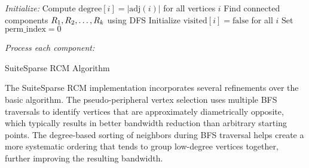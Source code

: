 \begin{algorithm}
    
    \BlankLine
    
    \emph{Initialize:}\;
    Compute $\text{degree}[i] = |\text{adj}(i)|$ for all vertices $i$\;
    Find connected components $R\sb{1}, R\sb{2}, \ldots, R\sb{k}$ using DFS\;
    Initialize $\text{visited}[i] = \text{false}$ for all $i$\;
    Set $\text{perm\_index} = 0$\;
    \BlankLine
    
    \emph{Process each component:}\;
    
    \;
    
    \caption{SuiteSparse RCM Algorithm}
    \label{alg:rcm}
\end{algorithm}

The SuiteSparse RCM implementation incorporates several refinements over the basic algorithm. The pseudo-peripheral vertex selection uses multiple BFS traversals to identify vertices that are approximately diametrically opposite, which typically results in better bandwidth reduction than arbitrary starting points. The degree-based sorting of neighbors during BFS traversal helps create a more systematic ordering that tends to group low-degree vertices together, further improving the resulting bandwidth.

